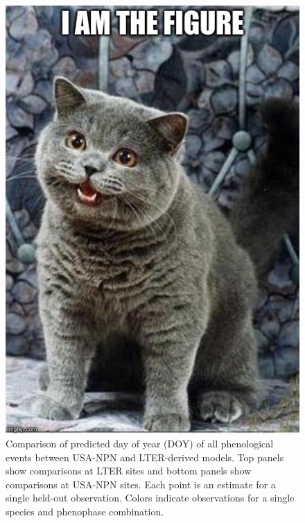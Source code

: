 \begin{figure}
	\centering
		\includegraphics[scale=0.3]{images/figure_filler.jpg}
	\caption[Comparison of predicted day of year (DOY) of all phenological events between USA-NPN and LTER-derived models]{Comparison of predicted day of year (DOY) of all phenological events between USA-NPN and LTER-derived models. Top panels show comparisons at LTER sites and bottom panels show comparisons at USA-NPN sites. Each point is an estimate for a single held-out observation. Colors indicate observations for a single species and phenophase combination.} \label{fig-2-3}
\end{figure}



